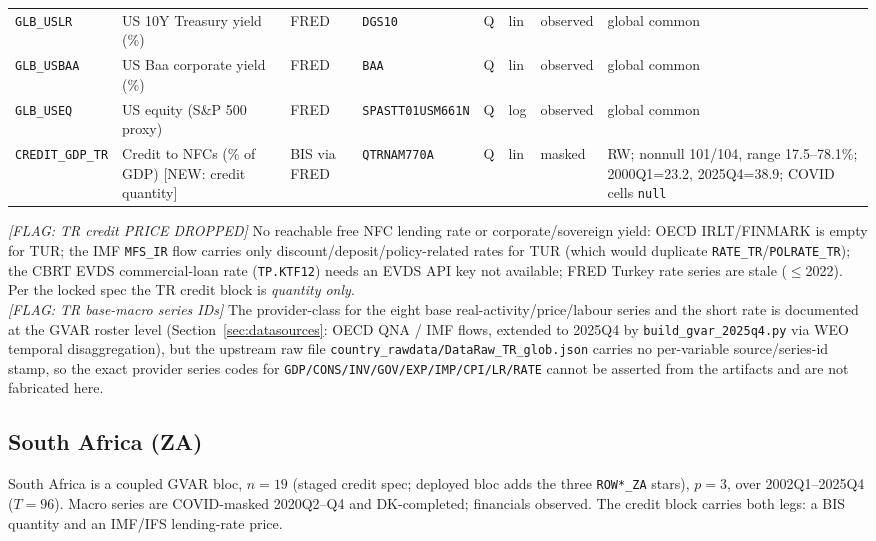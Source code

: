 {\begin{longtable}{p{2.3cm}p{3.3cm}p{2.1cm}p{2.2cm}p{0.6cm}p{1.4cm}p{1.9cm}p{2.4cm}}
\texttt{GLB\_USLR}  & US 10Y Treasury yield (\%)            & FRED & \texttt{DGS10} & Q & lin & observed & global common \\
\texttt{GLB\_USBAA} & US Baa corporate yield (\%)           & FRED & \texttt{BAA} & Q & lin & observed & global common \\
\texttt{GLB\_USEQ}  & US equity (S\&P 500 proxy)            & FRED & \texttt{SPASTT01USM661N} & Q & log & observed & global common \\
\texttt{CREDIT\_GDP\_TR} & Credit to NFCs (\% of GDP) [NEW: credit quantity] & BIS via FRED & \texttt{QTRNAM770A} & Q & lin & masked & RW; nonnull 101/104, range 17.5--78.1\%; 2000Q1=23.2, 2025Q4=38.9; COVID cells \texttt{null} \\
\end{longtable}}

\noindent\textit{[FLAG: TR credit PRICE DROPPED]} No reachable free NFC lending
rate or corporate/sovereign yield: OECD IRLT/FINMARK is empty for TUR; the IMF
\texttt{MFS\_IR} flow carries only discount/deposit/policy-related rates for TUR
(which would duplicate \texttt{RATE\_TR}/\texttt{POLRATE\_TR}); the CBRT EVDS
commercial-loan rate (\texttt{TP.KTF12}) needs an EVDS API key not available;
FRED Turkey rate series are stale ($\le$2022). Per the locked spec the TR credit
block is \emph{quantity only}.\\
\textit{[FLAG: TR base-macro series IDs]} The provider-class for the eight base
real-activity/price/labour series and the short rate is documented at the GVAR
roster level (Section~\ref{sec:datasources}: OECD QNA / IMF flows, extended to
2025Q4 by \texttt{build\_gvar\_2025q4.py} via WEO temporal disaggregation), but
the upstream raw file \texttt{country\_rawdata/DataRaw\_TR\_glob.json} carries no
per-variable source/series-id stamp, so the exact provider series codes for
\texttt{GDP/CONS/INV/GOV/EXP/IMP/CPI/LR/RATE} cannot be asserted from the
artifacts and are not fabricated here.

\subsection{South Africa (ZA)}\label{sec:data:ZA}

South Africa is a coupled GVAR bloc, $n=19$ (staged credit spec; deployed bloc
adds the three \texttt{ROW*\_ZA} stars), $p=3$, over 2002Q1--2025Q4 ($T=96$).
Macro series are COVID-masked 2020Q2--Q4 and DK-completed; financials observed.
The credit block carries both legs: a BIS quantity and an IMF/IFS lending-rate
price.

